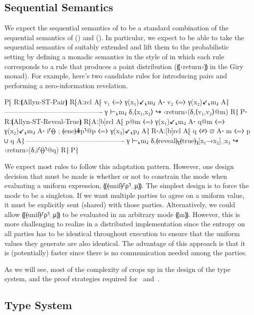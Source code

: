 \subsection{Sequential Semantics}
\label{subsec:proposal-design-seq}

We expect the sequential semantics of \lang to be a standard combination of the sequential
semantics of \mpc () and \obliv (). In particular, we
expect to be able to take the sequential semantics of \mpc suitably extended and lift them
to the probabilistic setting by defining a monadic semantics in the style of \obliv in which
each \mpc rule corresponds to a \lang rule that produces a point distribution (⸨‹return›⸩ in
the Giry monad). For example, here's two candidate rules for introducing pairs and performing
a zero-information revelation.

P⁅ Rː⦗Allyn-ST-Pair⦘
   R⁅{Aːrcl
      A⁅ v₁ ⧼=⧽ γ(x₁)↙⸤m⸥
      A⁃ v₂ ⧼=⧽ γ(x₂)↙⸤m⸥
      A⁆}
      -------------------------------------------
      γ ⊢⸤m⸥ δ,⟨x₁,x₂⟩ ↪ ‹return›(δ,⟨v₁,v₂⟩@m)
      R⁆
P⁃ Rː⦗Allyn-ST-Reveal-True⦘
   R⁅{Aː[b]rcl
      A⁅ p@m          ⧼=⧽ γ(x₁)↙⸤m⸥
      A⁃ q@m          ⧼=⧽ γ(x₂)↙⸤m⸥
      A⁃ i⸢⦑\faThumbsUp⦒ ; ⦑enc⦒⋕p⸣@p ⧼=⧽ γ(x₃)↙⸤p⸥
      A⁆}
   R⁃{Aː[b]rcl
      A⁅ q ⧼≠⧽ ∅
      A⁃ m ⧼=⧽ p ∪ q
      A⁆}
      -------------------------------------------
      γ ⊢⸤m⸥ δ,⦑reveal⦒⸤⦑true⦒⸥[x₁→x₂]␣x₃ ↪ ‹return›(δ,i⸢⦑\faThumbsDown⦒⸣@q)
   R⁆
P⁆

We expect most rules to follow this adaptation pattern. However, one design decision
that must be made is whether or not to constrain the mode when evaluating a uniform
expression, ⸨⦑unif⦒⸢ρ⸣␣μ⸩. The simplest design is to force the mode to be a singleton.
If we want multiple parties to agree on a uniform value, it must be explicitly sent (shared)
with those parties. Alternatively, we could allow ⸨⦑unif⦒⸢ρ⸣␣μ⸩ to be evaluated in an arbitrary
mode ⸨m⸩. However, this is more challenging to realize in a distributed implementation since the
entropy on all parties has to be identical throughout execution to ensure that the uniform values
they generate are also identical. The advantage of this approach is that it is (potentially) faster
since there is no communication needed among the parties.

As we will see, most of the complexity of \lang crops up in the design of the type system, and the
proof strategies required for~ and~.

\subsection{Type System}
\label{subsec:proposal-design-types}

